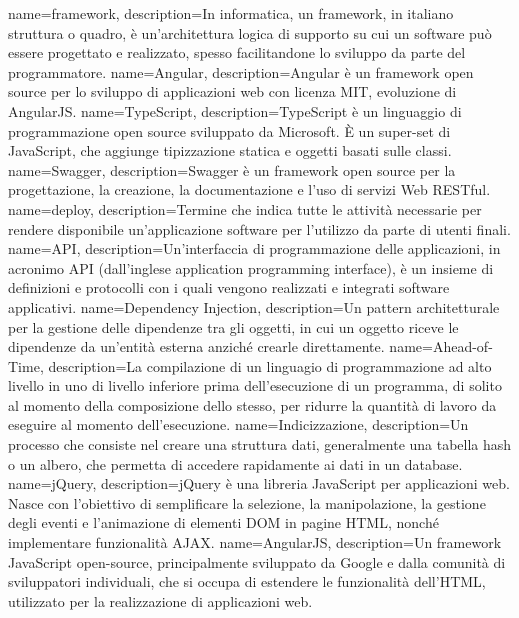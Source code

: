 {
    name=framework,
    description={In informatica, un framework, in italiano struttura o quadro, è un'architettura logica di supporto su cui un software può essere progettato e realizzato, spesso facilitandone lo sviluppo da parte del programmatore.}
}
{
    name=Angular,
    description={Angular è un framework open source per lo sviluppo di applicazioni web con licenza MIT, evoluzione di AngularJS.}
}
{
    name=TypeScript,
    description={TypeScript è un linguaggio di programmazione open source sviluppato da Microsoft. È un super-set di JavaScript, che aggiunge tipizzazione statica e oggetti basati sulle classi.}
}
{
    name=Swagger,
    description={Swagger è un framework open source per la progettazione, la creazione, la documentazione e l'uso di servizi Web RESTful.}
}
{
    name=deploy,
    description={Termine che indica tutte le attività necessarie per rendere disponibile un'applicazione software per l'utilizzo da parte di utenti finali.}
}
{
    name=API,
    description={Un'interfaccia di programmazione delle applicazioni, in acronimo API (dall'inglese application programming interface), è un insieme di definizioni e protocolli con i quali vengono realizzati e integrati software applicativi.}
}
{
    name=Dependency Injection,
    description={Un pattern architetturale per la gestione delle dipendenze tra gli oggetti, in cui un oggetto riceve le dipendenze da un'entità esterna anziché crearle direttamente.}
}
{
    name=Ahead-of-Time,
    description={La compilazione di un linguagio di programmazione ad alto livello in uno di livello inferiore prima dell'esecuzione di un programma, di solito al momento della composizione dello stesso, per ridurre la quantità di lavoro da eseguire al momento dell'esecuzione.}
}
{
    name=Indicizzazione,
    description={Un processo che consiste nel creare una struttura dati, generalmente una tabella hash o un albero, che permetta di accedere rapidamente ai dati in un database.}
}
{
    name=jQuery,
    description={jQuery è una libreria JavaScript per applicazioni web. Nasce con l'obiettivo di semplificare la selezione, la manipolazione, la gestione degli eventi e l'animazione di elementi DOM in pagine HTML, nonché implementare funzionalità AJAX.}
}
{
    name=AngularJS,
    description={Un framework JavaScript open-source, principalmente sviluppato da Google e dalla comunità di sviluppatori individuali, che si occupa di estendere le funzionalità dell'HTML, utilizzato per la realizzazione di applicazioni web.}
}
